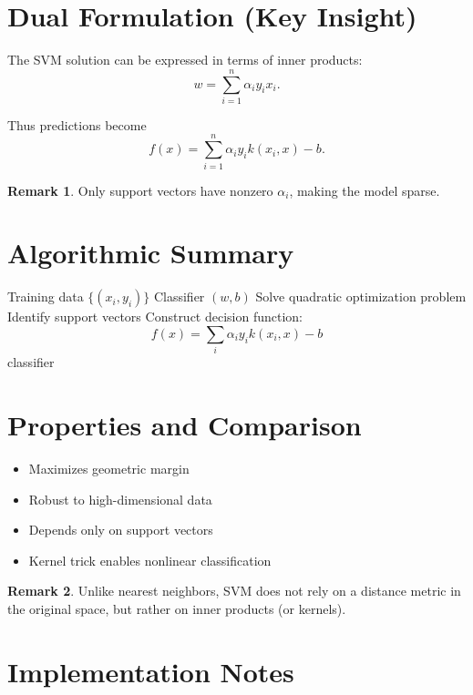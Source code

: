 \documentclass[12pt,oneside]{book}
\numberwithin{equation}{section}
\theoremstyle{definition}
\newtheorem{remark}{Remark}[section]
\theoremstyle{plain}
\theoremstyle{remark}
\begin{document}
\section{Dual Formulation (Key Insight)}

The SVM solution can be expressed in terms of inner products:
\[
w = \sum_{i=1}^n \alpha_i y_i x_i.
\]

Thus predictions become
\[
f(x) = \sum_{i=1}^n \alpha_i y_i k(x_i,x) - b.
\]

\begin{remark}
Only support vectors have nonzero $\alpha_i$, making the model sparse.
\end{remark}

\section{Algorithmic Summary}

\begin{algorithm}[H]
\caption{Support Vector Machine (Conceptual)}
\begin{algorithmic}[1]
\Require Training data $\{(x_i,y_i)\}$
\Ensure Classifier $(w,b)$
\State Solve quadratic optimization problem
\State Identify support vectors
\State Construct decision function:
\[
f(x) = \sum_i \alpha_i y_i k(x_i,x) - b
\]
\State \Return classifier
\end{algorithmic}
\end{algorithm}

\section{Properties and Comparison}

\begin{itemize}
    \item Maximizes geometric margin
    \item Robust to high-dimensional data
    \item Depends only on support vectors
    \item Kernel trick enables nonlinear classification
\end{itemize}

\begin{remark}
Unlike nearest neighbors, SVM does not rely on a distance metric in the original space, but rather on inner products (or kernels).
\end{remark}

\section{Implementation Notes}
\end{document}
